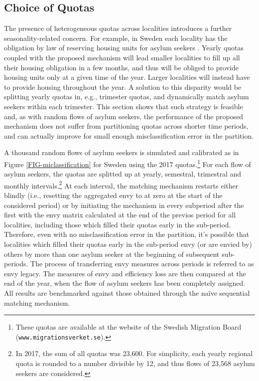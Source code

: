 \documentclass[12pt,fleqn]{article}
\begin{document}
\subsection{Choice of Quotas}\label{SEC:quotas}
The presence of heterogeneous quotas across localities introduces a further seasonality-related concern. For example, in Sweden each locality has the obligation by law of reserving housing units for asylum seekers \citep[Swedish Law,][]{SFS2016}. Yearly quotas coupled with the proposed mechanism will lead smaller localities to fill up all their housing obligation in a few months, and thus will be obliged to provide housing units only at a given time of the year. Larger localities will instead have to provide housing throughout the year. A solution to this disparity would be splitting yearly quotas in, e.g., trimester quotas, and dynamically match asylum seekers within each trimester. This section shows that such strategy is feasible and, as with random flows of asylum seekers, the performance of the proposed mechanism does not suffer from partitioning quotas across shorter time periods, and can actually improve for small enough misclassification error in the partition.

A thousand random flows of asylum seekers is simulated and calibrated as in Figure \ref{FIG-miclassification} for Sweden using the 2017 quotas.\footnote{These quotas are available at the website of the Swedish Migration Board (\texttt{www.migrationsverket.se}).} For each flow of asylum seekers, the quotas are splitted up at yearly, semestral, trimestral and monthly intervals.\footnote{In 2017, the sum of all quotas was 23,600. For simplicity, each yearly regional quota is rounded to a number divisible by 12, and thus flows of 23,568 asylum seekers are considered.} At each interval, the matching mechanism restarts either blindly (i.e., resetting the aggregated envy to at zero at the start of the considered period) or by initiating the mechanism in every subperiod after the first with the envy matrix calculated at the end of the previos period for all localities, including those which filled their quotas early in the sub-period. Therefore, even with no misclassification error in the partition, it's possible that localities which filled their quotas early in the sub-period envy (or are envied by) others by more than one asylum seeker at the beginning of subsequent sub-periods. The process of transferring envy measures across periods is referred to as envy legacy. The measures of envy and efficiency loss are then compared at the end of the year, when the flow of asylum seekers has been completely assigned. All results are benchmarked against those obtained through the na\"{i}ve sequential matching mechanism.
\end{document}
